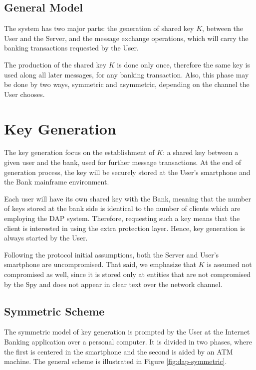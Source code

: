 \subsection{General Model}
The system has two major parts: the generation of shared key $K$, between the User and the Server, and the message exchange operations, which will carry the banking transactions requested by the User.

The production of the shared key $K$ is done only once, therefore the same key is used along all later messages, for any banking transaction. Also, this phase may be done by two ways, symmetric and asymmetric, depending on the channel the User chooses.


















\section{Key Generation}
The key generation focus on the establishment of $K$: a shared key between a given user and the bank, used for further message transactions. At the end of generation process, the key will be securely stored at the User's smartphone and the Bank mainframe environment.

Each user will have its own shared key with the Bank, meaning that the number of keys stored at the bank side is identical to the number of clients which are employing the DAP system. Therefore, requesting such a key means that the client is interested in using the extra protection layer. Hence, key generation is always started by the User.

Following the protocol initial assumptions, both the Server and User's smartphone are uncompromised. That said, we emphasize that $K$ is assumed not compromised as well, since it is stored only at entities that are not compromised by the Spy and does not appear in clear text over the network channel.







\subsection{Symmetric Scheme}
The symmetric model of key generation is prompted by the User at the Internet Banking application over a personal computer. It is divided in two phases, where the first is centered in the smartphone and the second is aided by an ATM machine. The general scheme is illustrated in Figure \ref{fig:dap-symmetric}.

